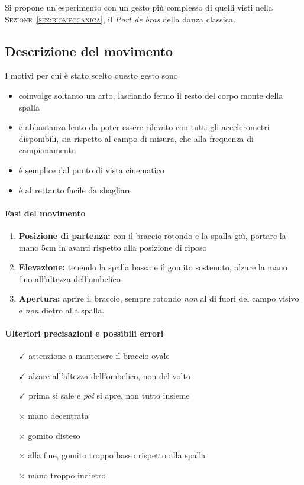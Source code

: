 Si propone un'esperimento con un gesto più complesso
di quelli visti nella \textsc{Sezione~\ref{sez:biomeccanica}},
il \textit{Port de bras} della danza classica.

\subsection{Descrizione del movimento}
I motivi per cui è stato scelto questo gesto sono  
\begin{itemize}
	\item coinvolge soltanto un arto, lasciando fermo il resto del corpo monte della spalla
    \item è abbastanza lento da poter essere rilevato con tutti gli accelerometri disponibili, sia rispetto al campo di misura, che alla frequenza di campionamento
    \item è semplice dal punto di vista cinematico
    \item è altrettanto facile da sbagliare
\end{itemize}

\paragraph{Fasi del movimento}
\begin{enumerate}
	\item \textbf{Posizione di partenza:} con il braccio rotondo e la spalla giù, portare la mano 5cm in avanti rispetto alla posizione di riposo
    \item \textbf{Elevazione:} tenendo la spalla bassa e il gomito sostenuto, alzare la mano fino all'altezza dell'ombelico
    \item \textbf{Apertura:} aprire il braccio, sempre rotondo \emph{non} al di fuori del campo visivo e \emph{non} dietro alla spalla.
\end{enumerate}

\paragraph{Ulteriori precisazioni e possibili errori}
\begin{itemize}
    \item [$\checkmark$] attenzione a mantenere il braccio ovale
    \item [$\checkmark$] alzare all'altezza dell'ombelico, non del volto
    \item [$\checkmark$] prima si sale e \emph{poi} si apre, non tutto insieme
	\item[$\times$] mano decentrata
   	\item[$\times$] gomito disteso
	\item[$\times$] alla fine, gomito troppo basso rispetto alla spalla
   	\item[$\times$] mano troppo indietro
\end{itemize}






